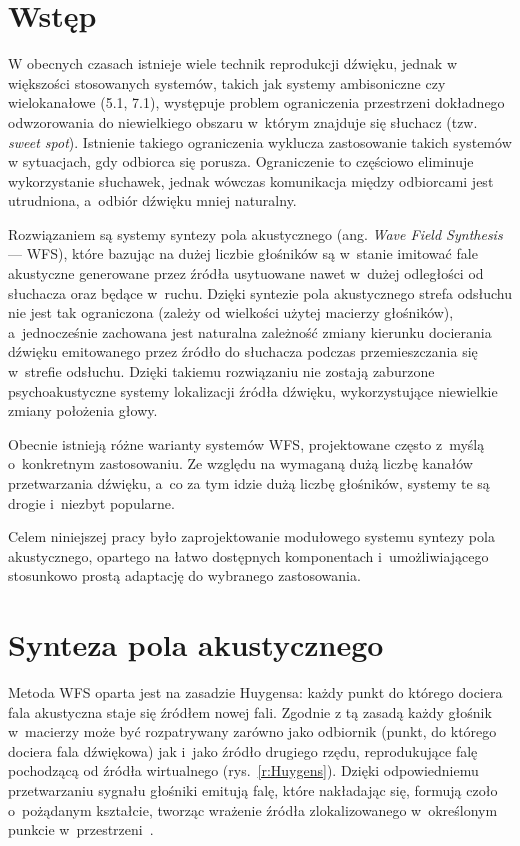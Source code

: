 \documentclass[10pt, a4paper]{article}
\let\Oldsection\section
\renewcommand{\section}{\FloatBarrier\Oldsection}
\begin{document}
\section{Wstęp}

W obecnych czasach istnieje wiele technik reprodukcji dźwięku, jednak w~
większości stosowanych systemów, takich jak systemy ambisoniczne czy
wielokanałowe (5.1, 7.1), występuje problem ograniczenia przestrzeni dokładnego
odwzorowania do niewielkiego obszaru w~którym znajduje się słuchacz (tzw.
\textit{sweet spot}). Istnienie takiego ograniczenia wyklucza zastosowanie 
takich systemów w sytuacjach, gdy odbiorca się porusza. Ograniczenie to częściowo
eliminuje wykorzystanie słuchawek, jednak wówczas komunikacja między odbiorcami
jest utrudniona, a~odbiór dźwięku mniej naturalny.

Rozwiązaniem są systemy syntezy pola akustycznego (ang.
\textit{Wave Field Synthesis} --- WFS), które bazując na dużej liczbie
głośników są w~stanie imitować fale akustyczne generowane przez źródła
usytuowane nawet w~dużej odległości od słuchacza oraz będące w~ruchu. Dzięki syntezie pola
akustycznego strefa odsłuchu nie jest tak ograniczona (zależy od wielkości użytej
macierzy głośników), a~jednocześnie zachowana jest naturalna zależność zmiany
kierunku docierania dźwięku emitowanego przez źródło do słuchacza podczas
przemieszczania się w~strefie odsłuchu. Dzięki takiemu rozwiązaniu nie zostają
zaburzone psychoakustyczne systemy lokalizacji źródła dźwięku, wykorzystujące
niewielkie zmiany położenia głowy. 

Obecnie istnieją różne warianty systemów WFS, projektowane często z~myślą 
o~konkretnym zastosowaniu. Ze względu na wymaganą dużą liczbę kanałów 
przetwarzania dźwięku, a~co za tym idzie dużą liczbę głośników, systemy te 
są drogie i~niezbyt popularne. 

Celem niniejszej pracy było zaprojektowanie modułowego systemu syntezy pola
akustycznego, opartego na łatwo dostępnych komponentach i~umożliwiającego
stosunkowo prostą adaptację do wybranego zastosowania.

\section{Synteza pola akustycznego}

Metoda WFS oparta jest na zasadzie Huygensa: każdy punkt do którego dociera
fala akustyczna staje się źródłem nowej fali. Zgodnie z tą zasadą każdy głośnik
w~macierzy może być rozpatrywany zarówno jako odbiornik (punkt, do którego dociera 
fala dźwiękowa) jak i~jako źródło drugiego rzędu, reprodukujące falę pochodzącą od 
źródła wirtualnego (rys.~\ref{r:Huygens}). Dzięki odpowiedniemu przetwarzaniu sygnału głośniki emitują
falę, które nakładając się, formują czoło o~pożądanym kształcie, tworząc wrażenie
źródła zlokalizowanego w~określonym punkcie w~przestrzeni~\cite{hq_rendering}.
\end{document}
